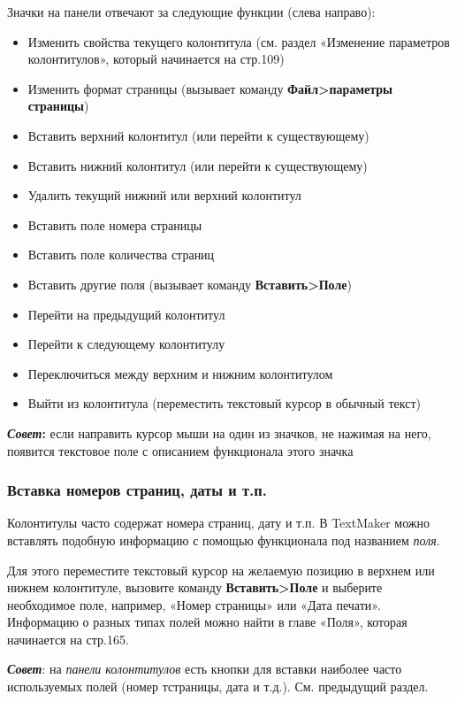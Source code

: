\documentclass[a4paper,10pt]{article}
\begin{document}
Значки на панели отвечают за следующие функции (слева направо):
\begin{itemize}
 \item Изменить свойства текущего колонтитула (см. раздел «Изменение параметров колонтитулов», который начинается на стр.109)
 \item Изменить формат страницы (вызывает команду \textbf{Файл>параметры страницы})
 \item Вставить верхний колонтитул (или перейти к существующему)
 \item Вставить нижний колонтитул (или перейти к существующему)
 \item Удалить текущий нижний или верхний колонтитул
\item Вставить поле номера страницы
\item Вставить поле количества страниц
\item Вставить другие поля (вызывает команду \textbf{Вставить>Поле})
\item Перейти на предыдущий колонтитул
\item Перейти к следующему колонтитулу
\item Переключиться между верхним и нижним колонтитулом
\item Выйти из колонтитула (переместить текстовый курсор в обычный текст)
\end{itemize}

\begin{mdframed}[backgroundcolor=blue!10]
\textbf{\textit{Совет}:} если направить курсор мыши на один из значков, не нажимая на него, появится текстовое поле с описанием функционала этого значка
\end{mdframed}

\subsubsection{Вставка номеров страниц, даты и т.п.}
Колонтитулы часто содержат номера страниц, дату и т.п. В TextMaker можно вставлять подобную информацию с помощью функционала под названием \textit{поля}.

Для этого переместите текстовый курсор на желаемую позицию в верхнем или нижнем колонтитуле, вызовите команду \textbf{Вставить>Поле} и выберите необходимое поле, например, «Номер страницы» или «Дата печати». Информацию о разных типах полей можно найти в главе «Поля», которая начинается на стр.165.

\textit{\textbf{Совет}}: на \textit{панели колонтитулов} есть кнопки для вставки наиболее часто используемых полей (номер тстраницы, дата и т.д.). См. предыдущий раздел.
\end{document}
